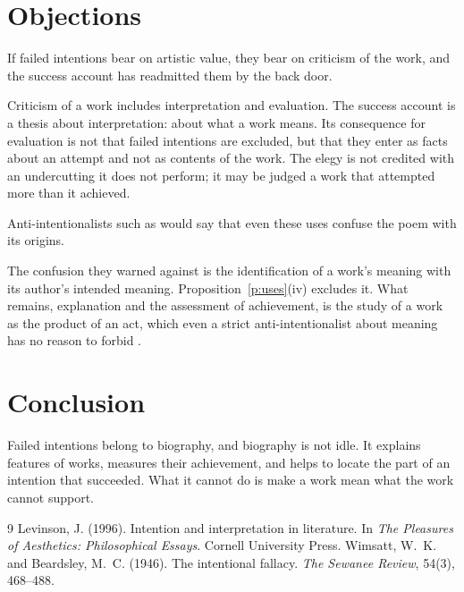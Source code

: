 \documentclass{situationist-preprint}
\begin{document}
\section{Objections}

\begin{objection}
If failed intentions bear on artistic value, they bear on criticism of the work, and the success account has readmitted them by the back door.
\end{objection}

\begin{reply}
Criticism of a work includes interpretation and evaluation. The success account is a thesis about interpretation: about what a work means. Its consequence for evaluation is not that failed intentions are excluded, but that they enter as facts about an attempt and not as contents of the work. The elegy is not credited with an undercutting it does not perform; it may be judged a work that attempted more than it achieved.
\end{reply}

\begin{objection}
Anti-intentionalists such as \citet{WimsattBeardsley1946} would say that even these uses confuse the poem with its origins.
\end{objection}

\begin{reply}
The confusion they warned against is the identification of a work's meaning with its author's intended meaning. Proposition~\ref{p:uses}(iv) excludes it. What remains, explanation and the assessment of achievement, is the study of a work as the product of an act, which even a strict anti-intentionalist about meaning has no reason to forbid \citep{Levinson1996}.
\end{reply}

\section{Conclusion}

Failed intentions belong to biography, and biography is not idle. It explains features of works, measures their achievement, and helps to locate the part of an intention that succeeded. What it cannot do is make a work mean what the work cannot support.

\begin{thebibliography}{9}\small
{} Levinson, J. (1996). Intention and interpretation in literature. In \emph{The Pleasures of Aesthetics: Philosophical Essays}. Cornell University Press.
 Wimsatt, W.~K. and Beardsley, M.~C. (1946). The intentional fallacy. \emph{The Sewanee Review}, 54(3), 468--488.
\end{thebibliography}
\end{document}
